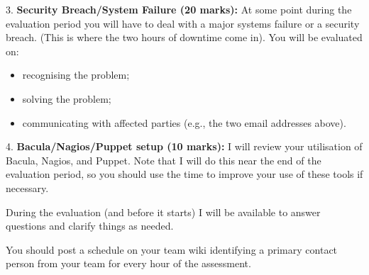 \documentclass{article}   	%
\begin{document}
\vspace{0.5cm}

3.  \textbf{Security Breach/System Failure (20 marks):}  At some point during the evaluation period you will have to deal with a major systems failure or a security breach.  (This is where the two hours of downtime come in).  You will be evaluated on:

\begin{itemize}
\item recognising the problem;
\item solving the problem;
\item communicating with affected parties (e.g., the two email addresses above).
\end{itemize}

\vspace{0.5cm}

4.  \textbf{Bacula/Nagios/Puppet setup (10 marks):} I will review your utilisation of Bacula, Nagios, and Puppet.  Note that I will do this near the end of the evaluation period, so you should use the time to improve your use of these tools if necessary.

During the evaluation (and before it starts) I will be available to answer questions and clarify things as needed.

You should post a schedule on your team wiki identifying a primary contact person from your team for every hour of the assessment.
\end{document}
